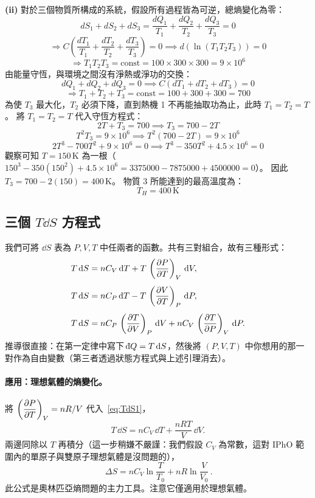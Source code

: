 \textbf{(ii)} 對於三個物質所構成的系統，假設所有過程皆為可逆，總熵變化為零：
\[ dS_1 + dS_2 + dS_3 = \frac{dQ_1}{T_1} + \frac{dQ_2}{T_2} + \frac{dQ_3}{T_3} = 0 \]
\[ \Rightarrow C\left(\frac{dT_1}{T_1} + \frac{dT_2}{T_2} + \frac{dT_3}{T_3}\right) = 0 \implies d(\ln(T_1 T_2 T_3)) = 0 \]
\[ \Rightarrow T_1 T_2 T_3 = \text{const} = 100 \times 300 \times 300 = 9 \times 10^6 \]
由能量守恆，與環境之間沒有淨熱或淨功的交換：
\[ dQ_1 + dQ_2 + dQ_3 = 0 \implies C(dT_1 + dT_2 + dT_3) = 0 \]
\[ \Rightarrow T_1 + T_2 + T_3 = \text{const} = 100 + 300 + 300 = 700 \]
為使 $T_3$ 最大化，$T_2$ 必須下降，直到熱機 1 不再能抽取功為止，此時 $T_1 = T_2 = T$。
將 $T_1 = T_2 = T$ 代入守恆方程式：
\[ 2T + T_3 = 700 \implies T_3 = 700 - 2T \]
\[ T^2 T_3 = 9 \times 10^6 \implies T^2(700 - 2T) = 9 \times 10^6 \]
\[ 2T^3 - 700T^2 + 9 \times 10^6 = 0 \implies T^3 - 350T^2 + 4.5 \times 10^6 = 0 \]
觀察可知 $T = 150\,\text{K}$ 為一根（$150^3 - 350(150^2) + 4.5 \times 10^6 = 3375000 - 7875000 + 4500000 = 0$）。
因此 $T_3 = 700 - 2(150) = 400\,\text{K}$。
物質 3 所能達到的最高溫度為：
\[ T_H = 400\,\text{K} \]

\subsection{三個 $T\dd S$ 方程式}

我們可將 $\dd S$ 表為 $P,V,T$ 中任兩者的函數。共有三對組合，故有三種形式：
\begin{align}
    T\,\mathrm{d} S &= n C_V\,\mathrm{d} T + T\,\left(\dfrac{\partial P}{\partial T}\right)_V\,\mathrm{d} V, \label{eq:TdS1}\\[4pt]
    T\,\mathrm{d} S &= n C_P\,\mathrm{d} T - T\,\left(\dfrac{\partial V}{\partial T}\right)_P\,\mathrm{d} P, \label{eq:TdS2}\\[4pt]
    T\,\mathrm{d} S &= n C_P\,\left(\dfrac{\partial T}{\partial V}\right)_P\,\mathrm{d} V + n C_V\,\left(\dfrac{\partial T}{\partial P}\right)_V\,\mathrm{d} P. \label{eq:TdS3}
\end{align}
推導很直接：在第一定律中寫下 $\dbar Q = T\,\dd S$，然後將 $(P,V,T)$ 中你想用的那一對作為自由變數（第三者透過狀態方程式與上述引理消去）。

\paragraph{應用：理想氣體的熵變化。}
將 $\left(\dfrac{\partial P}{\partial T}\right)_V = nR/V$ 代入~\eqref{eq:TdS1}，
\[
    T\,\dd S = n C_V\,\dd T + \frac{nRT}{V}\,\dd V.
\]
兩邊同除以 $T$ 再積分（這一步稍嫌不嚴謹：我們假設 $C_V$ 為常數，這對 IPhO 範圍內的單原子與雙原子理想氣體是沒問題的），
\[
    \boxed{\,\Delta S = n C_V \ln\!\frac{T}{T_0} + nR \ln\!\frac{V}{V_0}\,}.
\]
此公式是奧林匹亞熵問題的主力工具。注意它僅適用於理想氣體。


